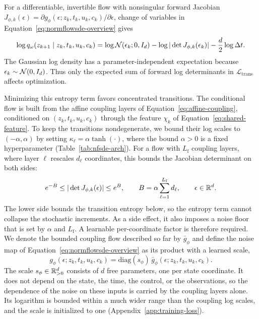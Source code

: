 For a differentiable, invertible flow with nonsingular forward Jacobian $J_{\phi,k}(\epsilon)=\partial g_\phi(\epsilon;z_k,t_k,u_k,c_k)/\partial\epsilon$, change of variables in Equation~\eqref{eq:normflowsde-overview} gives
\begin{equation}\label{eq:sampled-transition-density}
 \log q_\omega(z_{k+1}\mid z_k,t_k,u_k,c_k)
 =\log\mathcal N(\epsilon_k;0,I_d)
  -\log|\det J_{\phi,k}(\epsilon_k)|-\frac d2\log\Delta t.
\end{equation}
The Gaussian log density has a parameter-independent expectation because $\epsilon_k\sim\mathcal N(0,I_d)$. Thus only the expected sum of forward log determinants in $\mathcal L_{\mathrm{trans}}$ affects optimization.

Minimizing this entropy term favors concentrated transitions. The conditional flow is built from the affine coupling layers of Equation~\eqref{eq:affine-coupling}, conditioned on $(z_k,t_k,u_k,c_k)$ through the feature $\chi_k$ of Equation~\eqref{eq:shared-feature}. To keep the transitions nondegenerate, we bound their log scales to $(-\alpha,\alpha)$ by setting $\kappa_\ell=\alpha\tanh(\cdot)$, where the bound $\alpha>0$ is a fixed hyperparameter (Table~\ref{tab:nfsde-arch}). For a flow with $L_{\mathrm f}$ coupling layers, where layer $\ell$ rescales $d_\ell$ coordinates, this bounds the Jacobian determinant on both sides:
\begin{equation}\label{eq:training-determinant-bound}
 e^{-B}\leq|\det J_{\phi,k}(\epsilon)|\leq e^B,
 \qquad B=\alpha\sum_{\ell=1}^{L_{\mathrm f}} d_\ell,
 \qquad \epsilon\in\mathbb R^d.
\end{equation}
The lower side bounds the transition entropy below, so the entropy term cannot collapse the stochastic increments. As a side effect, it also imposes a noise floor that is set by $\alpha$ and $L_{\mathrm f}$. A learnable per-coordinate factor is therefore required. We denote the bounded coupling flow described so far by $\bar g_\phi$ and define the noise map of Equation~\eqref{eq:normflowsde-overview} as its product with a learned scale,
\begin{equation}\label{eq:learned-noise-scale}
 g_\phi(\epsilon;z_k,t_k,u_k,c_k)
 =\mathrm{diag}(s_\phi)\,\bar g_\phi(\epsilon;z_k,t_k,u_k,c_k).
\end{equation}
The scale $s_\phi\in\mathbb R^d_{>0}$ consists of $d$ free parameters, one per state coordinate. It does not depend on the state, the time, the control, or the observations, so the dependence of the noise on these inputs is carried by the coupling layers alone. Its logarithm is bounded within a much wider range than the coupling log scales, and the scale is initialized to one (Appendix~\ref{app:training-loss}).

